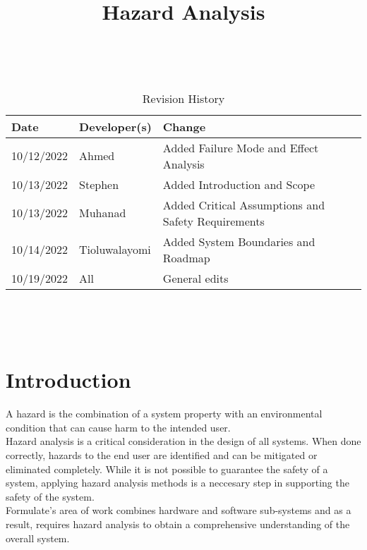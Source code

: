 \documentclass{article}
\title{Hazard Analysis\\\progname}
\author{\authname}
\date{}
\begin{document}
\maketitle
\thispagestyle{empty}

~\newpage


\begin{table}[hp]
\caption{Revision History} \label{TblRevisionHistory}
\begin{tabularx}{\textwidth}{llX}
\toprule
\textbf{Date} & \textbf{Developer(s)} & \textbf{Change}\\
\midrule
10/12/2022 & Ahmed & Added Failure Mode and Effect Analysis\\
10/13/2022 & Stephen & Added Introduction and Scope\\
10/13/2022 & Muhanad & Added Critical Assumptions and Safety Requirements\\
10/14/2022 & Tioluwalayomi & Added System Boundaries and Roadmap\\
10/19/2022 & All & General edits\\
\bottomrule
\end{tabularx}
\end{table}

\listoftables

~\newpage

\tableofcontents



~\newpage



\section{Introduction}

A hazard is the combination of a system property with an environmental condition that can cause harm to the intended user.\\

Hazard analysis is a critical consideration in the design of all systems. When done correctly, hazards to the end user are identified and can be mitigated or eliminated completely. While it is not possible to guarantee the safety of a system, applying hazard analysis methods is a neccesary step in supporting the safety of the system. \\

Formulate's area of work combines hardware and software sub-systems and as a result, requires hazard analysis to obtain a comprehensive understanding of the overall system. \\
\end{document}
